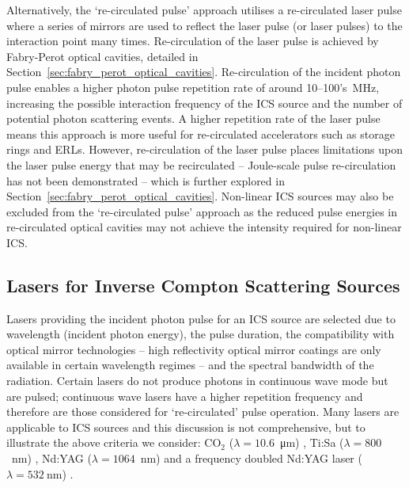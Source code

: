 \documentclass[../main.tex]{subfiles}
\begin{document}
Alternatively, the `re-circulated pulse' approach utilises a re-circulated laser pulse where a series of mirrors are used to reflect the laser pulse (or laser pulses) to the interaction point many times. Re-circulation of the laser pulse is achieved by Fabry-Perot optical cavities, detailed in Section~\ref{sec:fabry_perot_optical_cavities}. Re-circulation of the incident photon pulse enables a higher photon pulse repetition rate of around 10--100's~\si{\mega\hertz}, increasing the possible interaction frequency of the ICS source and the number of potential photon scattering events. A higher repetition rate of the laser pulse means this approach is more useful for re-circulated accelerators such as storage rings and ERLs. However, re-circulation of the laser pulse places limitations upon the laser pulse energy that may be recirculated -- Joule-scale pulse re-circulation has not been demonstrated -- which is further explored in Section~\ref{sec:fabry_perot_optical_cavities}. Non-linear ICS sources may also be excluded from the `re-circulated pulse' approach as the reduced pulse energies in re-circulated optical cavities may not achieve the intensity required for non-linear ICS.     

\subsection{Lasers for Inverse Compton Scattering Sources}
\label{sec:ICS_lasers}

Lasers providing the incident photon pulse for an ICS source are selected due to wavelength (incident photon energy), the pulse duration, the compatibility with optical mirror technologies -- high reflectivity optical mirror coatings are only available in certain wavelength regimes -- and the spectral bandwidth of the radiation. Certain lasers do not produce photons in continuous wave mode but are pulsed; continuous wave lasers have a higher repetition frequency and therefore are those considered for `re-circulated' pulse operation. Many lasers are applicable to ICS sources and this discussion is not comprehensive, but to illustrate the above criteria we consider: CO$_{2}$ ($\lambda=10.6$~\si{\micro\meter}) \cite{ovodenko2016high}, Ti:Sa ($\lambda=800$~\si{\nano\meter}) \cite{thorlabs2021tisa}, Nd:YAG ($\lambda=1064$~\si{\nano\meter}) \cite{thorlabs2021ndyag450,thorlabs2021ndyag200} and a frequency doubled Nd:YAG laser ($\lambda=532~\si{\nano\meter}$) \cite{chauchat2010instrumentation}.
\end{document}
